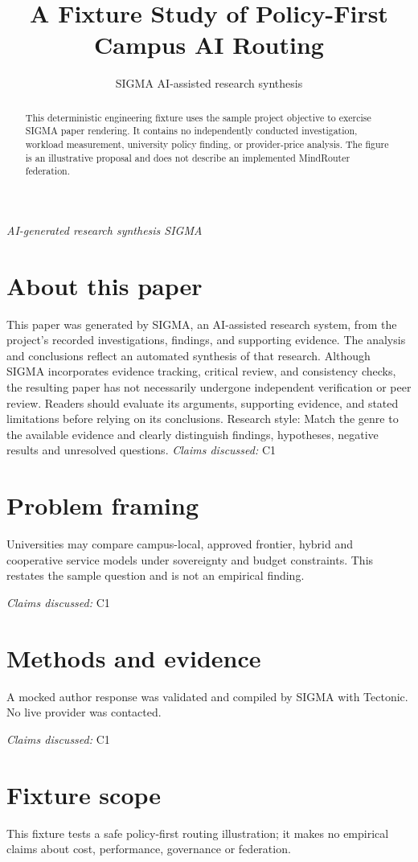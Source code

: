 \documentclass[11pt]{article}
\title{A Fixture Study of Policy-First Campus AI Routing}
\date{}
\author{SIGMA AI-assisted research synthesis}
\begin{document}
\maketitle
\begin{center}\small\textit{AI-generated research synthesis \textperiodcentered{} SIGMA}\end{center}

\begin{abstract}
This deterministic engineering fixture uses the sample project objective to exercise SIGMA paper rendering. It contains no independently conducted investigation, workload measurement, university policy finding, or provider-price analysis. The figure is an illustrative proposal and does not describe an implemented MindRouter federation.
\end{abstract}
\section*{About this paper}
This paper was generated by SIGMA, an AI-assisted research system, from the project's recorded investigations, findings, and supporting evidence.
The analysis and conclusions reflect an automated synthesis of that research. Although SIGMA incorporates evidence tracking, critical review, and consistency checks, the resulting paper has not necessarily undergone independent verification or peer review.
Readers should evaluate its arguments, supporting evidence, and stated limitations before relying on its conclusions.
Research style: Match the genre to the available evidence and clearly distinguish findings, hypotheses, negative results and unresolved questions.
\textit{Claims discussed: }C1
\section{Problem framing}
Universities may compare campus-local, approved frontier, hybrid and cooperative service models under sovereignty and budget constraints. This restates the sample question and is not an empirical finding.

\textit{Claims discussed: }C1
\section{Methods and evidence}
A mocked author response was validated and compiled by SIGMA with Tectonic. No live provider was contacted.

\textit{Claims discussed: }C1
\section{Fixture scope}
This fixture tests a safe policy-first routing illustration; it makes no empirical claims about cost, performance, governance or federation.
\end{document}
